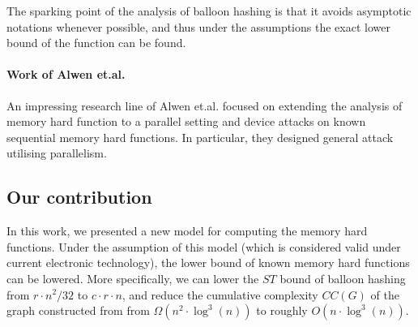 The sparking point of the analysis of balloon hashing is that it avoids asymptotic notations whenever possible, and thus under the assumptions the
exact lower bound of the function can be found.

\paragraph{Work of Alwen et.al.}
An impressing research line of Alwen et.al. focused on extending the analysis of memory hard function to a parallel setting and device attacks on known sequential
memory hard functions. In particular, they designed general attack utilising parallelism.

\subsection{Our contribution}
In this work, we presented a new model for computing the memory hard functions. Under the assumption of this model (which is considered valid under
current electronic technology), the lower bound of known memory hard functions can be lowered. More specifically, we can lower the $ST$ bound of balloon
hashing from $r \cdot n^2/32$ to $c \cdot r \cdot n$, and reduce the cumulative complexity $CC(G)$ of the graph constructed from \cite{alwen2015high}
from $\Omega(n^2 \cdot \log^3(n))$ to roughly $O(n \cdot \log^3(n))$.
